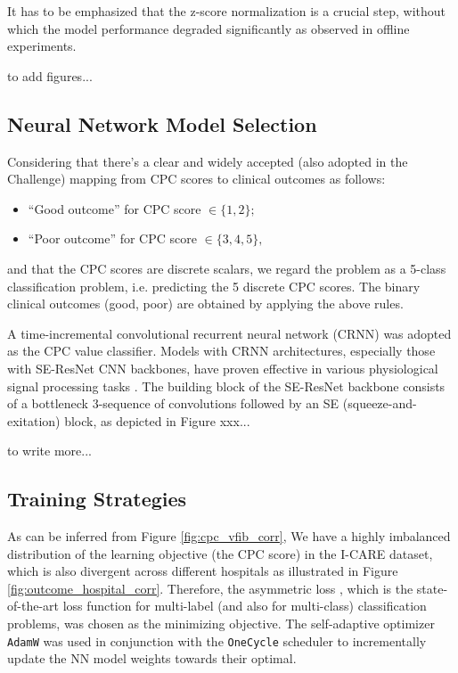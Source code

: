 It has to be emphasized that the z-score normalization is a crucial step, without which the model performance degraded significantly as observed in offline experiments.

to add figures...

\subsection{Neural Network Model Selection}
\label{subsec:models}

Considering that there's a clear and widely accepted (also adopted in the Challenge) mapping from CPC scores to clinical outcomes as follows:
\begin{itemize}
    \item ``Good outcome'' for CPC score $\in \{1, 2\};$
    \item ``Poor outcome'' for CPC score $\in \{3, 4, 5\},$
\end{itemize}
and that the CPC scores are discrete scalars, we regard the problem as a 5-class classification problem, i.e. predicting the 5 discrete CPC scores. The binary clinical outcomes (good, poor) are obtained by applying the above rules.

A time-incremental convolutional recurrent neural network (CRNN) \cite{Kang_2022_cinc2021_iop} was adopted as the CPC value classifier. Models with CRNN architectures, especially those with SE-ResNet \cite{hu2020senet} CNN backbones, have proven effective in various physiological signal processing tasks \cite{Kang_2022_cinc2021_iop, wen_cinc2022}. The building block of the SE-ResNet backbone consists of a bottleneck 3-sequence of convolutions followed by an SE (squeeze-and-exitation) block, as depicted in Figure xxx...

to write more...


\subsection{Training Strategies}
\label{subsec:training}

As can be inferred from Figure \ref{fig:cpc_vfib_corr}, We have a highly imbalanced distribution of the learning objective (the CPC score) in the I-CARE dataset, which is also divergent across different hospitals as illustrated in Figure \ref{fig:outcome_hospital_corr}. Therefore, the asymmetric loss \cite{ridnik2021asymmetric_loss}, which is the state-of-the-art loss function for multi-label (and also for multi-class) classification problems, was chosen as the minimizing objective. The self-adaptive optimizer \texttt{AdamW} was used in conjunction with the \texttt{OneCycle} scheduler to incrementally update the NN model weights towards their optimal.

